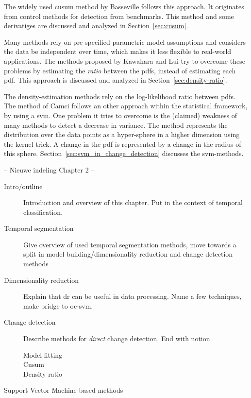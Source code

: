 The widely used \gls{cusum} method by Basseville \etal \cite{basseville1993detection} follows this approach.
It originates from control methods for detection from benchmarks.
This method and some derivatiges are discussed and analyzed in Section~\ref{sec:cusum}.

Many methods rely on pre-specified parametric model assumptions and considers the data be independent over time, which makes it less flexible to real-world applications.
The methods proposed by Kawahara \etal \cite{kawahara2009change} and Lui \etal \cite{liu2013change} try to overcome these problems by estimating the \emph{ratio} between the \glspl{pdf}, instead of estimating each \gls{pdf}.
This approach is discussed and analyzed in Section~\ref{sec:density-ratio}.

The density-estimation methods rely on the log-likelihood ratio between \glspl{pdf}.
The method of Camci \cite{camci2010change} follows an other approach within the statistical framework, by using a \gls{svm}.
One problem it tries to overcome is the (claimed) weakness of many methods to detect a decrease in variance.
The method represents the distribution over the data points as a hyper-sphere in a higher dimension using the kernel trick.
A change in the \gls{pdf} is represented by a change in the radius of this sphere.
Section~\ref{sec:svm_in_change_detection} discusses the \gls{svm}-methods.


-- Nieuwe indeling Chapter 2 --

\begin{description}
  \item[Intro/outline] Introduction and overview of this chapter. Put in the context of temporal classification.
  \item[Temporal segmentation] Give overview of used temporal segmentation methods, move towards a split in model building/dimensionality reduction and change detection methods
  \item[Dimensionality reduction] Explain that \gls{dr} can be useful in data processing. Name a few techniques, make bridge to \gls{oc-svm}.
  \item[Change detection] Describe methods for \emph{direct} change detection. End with notion
    \begin{description}
      \item[Model fitting]
      \item[Cusum]
      \item[Density ratio]
    \end{description}
  \item[Support Vector Machine based methods]

\end{description}

